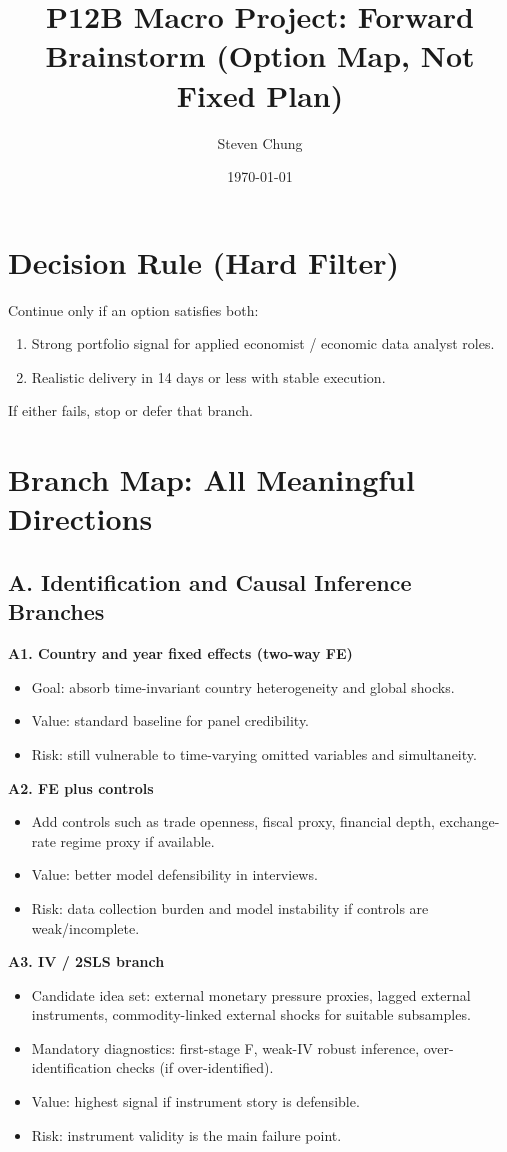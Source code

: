 \documentclass[11pt]{article}
\title{P12B Macro Project: Forward Brainstorm (Option Map, Not Fixed Plan)}
\author{Steven Chung}
\date{\today}
\begin{document}
\maketitle

\section{Decision Rule (Hard Filter)}
Continue only if an option satisfies both:
\begin{enumerate}
\item Strong portfolio signal for applied economist / economic data analyst roles.
\item Realistic delivery in 14 days or less with stable execution.
\end{enumerate}

If either fails, stop or defer that branch.

\section{Branch Map: All Meaningful Directions}

\subsection{A. Identification and Causal Inference Branches}
\textbf{A1. Country and year fixed effects (two-way FE)}
\begin{itemize}
\item Goal: absorb time-invariant country heterogeneity and global shocks.
\item Value: standard baseline for panel credibility.
\item Risk: still vulnerable to time-varying omitted variables and simultaneity.
\end{itemize}

\textbf{A2. FE plus controls}
\begin{itemize}
\item Add controls such as trade openness, fiscal proxy, financial depth, exchange-rate regime proxy if available.
\item Value: better model defensibility in interviews.
\item Risk: data collection burden and model instability if controls are weak/incomplete.
\end{itemize}

\textbf{A3. IV / 2SLS branch}
\begin{itemize}
\item Candidate idea set: external monetary pressure proxies, lagged external instruments, commodity-linked external shocks for suitable subsamples.
\item Mandatory diagnostics: first-stage F, weak-IV robust inference, over-identification checks (if over-identified).
\item Value: highest signal if instrument story is defensible.
\item Risk: instrument validity is the main failure point.
\end{itemize}
\end{document}

